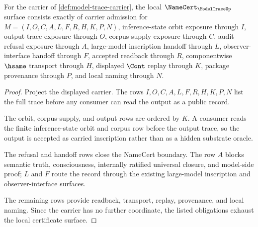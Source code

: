 \begin{theorem}
\label{thm:model-trace-namecert-obligations}
For the carrier of \autoref{def:model-trace-carrier}, the local $\NameCert_{\ModelTraceUp}$ surface consists exactly of carrier admission for $M=(I,O,C,A,L,F,R,H,K,P,N)$, inference-state orbit exposure through $I$, output trace exposure through $O$, corpus-supply exposure through $C$, audit-refusal exposure through $A$, large-model inscription handoff through $L$, observer-interface handoff through $F$, accepted readback through $R$, componentwise $\hsame$ transport through $H$, displayed $\Cont$ replay through $K$, package provenance through $P$, and local naming through $N$.
\end{theorem}
\begin{proof}
Project the displayed carrier. The rows $I,O,C,A,L,F,R,H,K,P,N$ list the full trace before any consumer can read the output as a public record.

The orbit, corpus-supply, and output rows are ordered by $K$. A consumer reads the finite inference-state orbit and corpus row before the output trace, so the output is accepted as carried inscription rather than as a hidden substrate oracle.

The refusal and handoff rows close the NameCert boundary. The row $A$ blocks semantic truth, consciousness, internally ratified universal closure, and model-side proof; $L$ and $F$ route the record through the existing large-model inscription and observer-interface surfaces.

The remaining rows provide readback, transport, replay, provenance, and local naming. Since the carrier has no further coordinate, the listed obligations exhaust the local certificate surface.
\end{proof}

